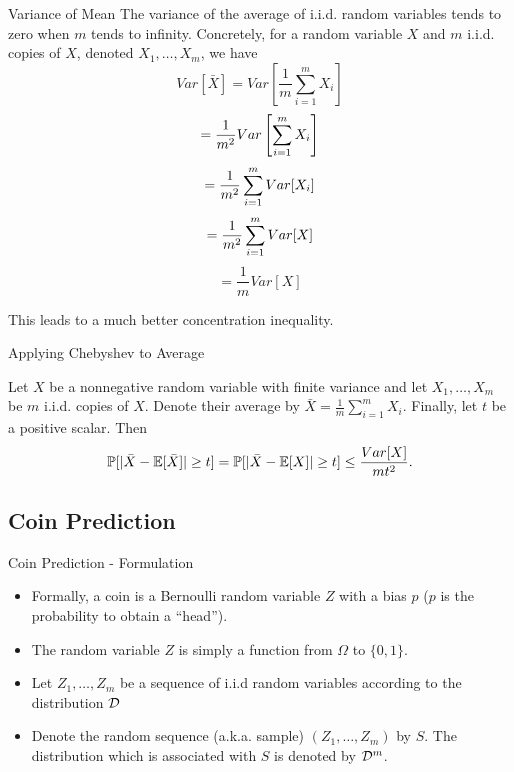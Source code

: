 \documentclass[11pt, usenames, dvipsnames]{beamer}
\begin{document}
\begingroup
\footnotesize%
\begin{frame}{Variance of Mean}
    The variance of the average of i.i.d. random variables tends to zero when $m$ tends to infinity. Concretely, for a random variable $X$ and $m$ i.i.d. copies of $X$, denoted $X_1,\ldots, X_m$, we have
$$Var \left[\bar{X} \right] = Var \left[\frac{1}{m} \sum_{i=1} ^m X_i \right] $$ 
\pause
$$= \frac{1}{m^2} Var \left[\sum_{i=1} ^m X_i \right] \notag $$
\pause
$$= \frac{1}{m^2} \sum_{i=1} ^m Var [X_i] \notag $$
\pause
$$= \frac{1}{m^2} \sum_{i=1} ^m Var [X] \notag $$
\pause
$$= \frac{1}{m} Var[X]$$

This leads to a much better concentration inequality.

\end{frame}
\endgroup

\begin{frame}{Applying Chebyshev to Average}
\begin{corollary}
Let $X$ be a nonnegative random variable with finite variance and let $X_1,\ldots,X_m$ be $m$ i.i.d. copies of $X$. Denote their average by $\bar{X}=\frac{1}{m} \sum_{i=1} ^m X_i$. Finally, let $t$ be a positive scalar. Then
$$
\mathbb{P} [|\bar{X}-\mathbb{E} [\bar{X}]| \geq t] = \mathbb{P} [|\bar{X}-\mathbb{E}[X]| \geq t] \leq \frac{Var[X]}{mt^2}.
$$
\end{corollary}
\end{frame}

\subsection{Coin Prediction}
\begin{frame}{Coin Prediction - Formulation}
\begin{itemize}
    \item Formally, a coin is a Bernoulli random variable $Z$ with a bias $p$ ($p$ is the probability to obtain a ``head'').
    \pause
    \item The random variable $Z$ is simply a function from $\Omega$ to
    $\{0,1\}$.
    \pause
    \item  Let $Z_1, \ldots, Z_m$ be a sequence of i.i.d random variables according to the distribution $\mathcal{D}$
    \pause
    \item Denote the random sequence  (a.k.a. sample) $(Z_1,\ldots, Z_m)$ by $S$. The distribution which is associated with $S$ is denoted by $\mathcal{D}^m$.
\end{itemize}
\end{frame}
\end{document}
